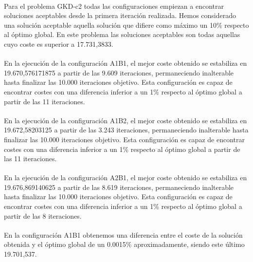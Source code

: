 	\paragraph{}Para el problema GKD-c2 todas las configuraciones empiezan a encontrar soluciones aceptables desde la primera iteración realizada. Hemos considerado una solución aceptable aquella solución que difiere como máximo un 10\% respecto al óptimo global. En este problema las soluciones aceptables son todas aquellas cuyo coste es superior a 17.731,3833.
	
	\paragraph{}En la ejecución de la configuración A1B1, el mejor coste obtenido se estabiliza en 19.670,576171875 a partir de las 9.609 iteraciones, permaneciendo inalterable hasta finalizar las 10.000 iteraciones objetivo. Esta configuración es capaz de encontrar costes con una diferencia inferior a un 1\% respecto al óptimo global a partir de las 11 iteraciones.
	
	\paragraph{}En la ejecución de la configuración A1B2, el mejor coste obtenido se estabiliza en 19.672,58203125 a partir de las 3.243 iteraciones, permaneciendo inalterable hasta finalizar las 10.000 iteraciones objetivo. Esta configuración es capaz de encontrar costes con una diferencia inferior a un 1\% respecto al óptimo global a partir de las 11 iteraciones.
	
	\paragraph{}En la ejecución de la configuración A2B1, el mejor coste obtenido se estabiliza en 19.676,869140625 a partir de las 8.619 iteraciones, permaneciendo inalterable hasta finalizar las 10.000 iteraciones objetivo. Esta configuración es capaz de encontrar costes con una diferencia inferior a un 1\% respecto al óptimo global a partir de las 8 iteraciones.
	
	\paragraph{}En la configuración A1B1 obtenemos una diferencia entre el coste de la solución obtenida y el óptimo global de un 0.0015\% aproximadamente, siendo este último 19.701,537.
	

